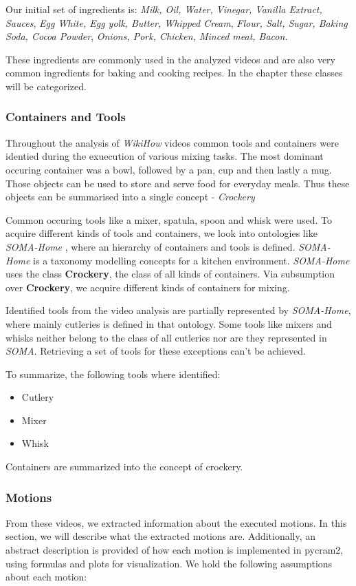 Our initial set of ingredients is: \textit{Milk, Oil, Water, Vinegar, Vanilla Extract, Sauces}, \textit{Egg White, Egg yolk, Butter, Whipped Cream}, \textit{Flour, Salt, Sugar, Baking Soda, Cocoa Powder},
\textit{Onions, Pork, Chicken, Minced meat, Bacon}.

These ingredients are commonly used in the analyzed videos and are also very common ingredients for baking and cooking recipes.
In the chapter  these classes will be categorized.

\subsubsection{Containers and Tools}
\label{sec:ContainersAndToolsAcquisition}
Throughout the analysis of \textit{WikiHow} videos common tools and containers were identied during the exuecution of various mixing tasks.
The most dominant occuring container was a bowl, followed by a pan, cup and then lastly a mug.
Those objects can be used to store and serve food for everyday meals. Thus these objects can be summarised 
into a single concept - \textit{Crockery} \cite{crockery}

Common occuring tools like a mixer, spatula, spoon and whisk were used. 
To acquire different kinds of tools and containers, we look into ontologies like \textit{SOMA-Home} \cite{soma},
where an hierarchy of containers and tools is defined. \textit{SOMA-Home} is a taxonomy modelling concepts for a kitchen environment. 
\textit{SOMA-Home} uses the class \textbf{Crockery}, the class of all kinds of containers.
Via subsumption over \textbf{Crockery}, we acquire different kinds of containers for mixing.

Identified tools from the video analysis are partially represented by \textit{SOMA-Home}, where mainly cutleries is defined in that ontology.
Some tools like mixers and whisks neither belong to the class of all cutleries nor are they represented in \textit{SOMA}. Retrieving a set of tools
for these exceptions can't be achieved.

To summarize, the following tools where identified: 
\begin{itemize}
  \item Cutlery
  \item Mixer
  \item Whisk
\end{itemize}

Containers are summarized into the concept of crockery. 
\subsubsection{Motions}
\label{sec:Motions}
From these videos, we extracted information about the executed motions. In this section, we will describe what the extracted motions are. 
Additionally, an abstract description is provided of how each motion is implemented in pycram2, using formulas and plots for visualization.
We hold the following assumptions about each motion:

